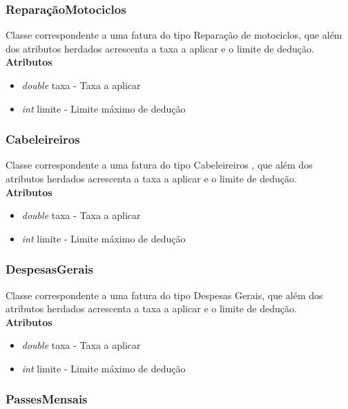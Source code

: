 \documentclass[10pt,a4paper]{article}
\begin{document}
\subsubsection{ReparaçãoMotociclos}

Classe correspondente a uma fatura do tipo Reparação de motociclos, que além dos atributos herdados acrescenta a taxa a aplicar e o limite de dedução.\\

{\bf{Atributos}}
\begin{itemize}
 \item \textit{double} taxa - Taxa a aplicar
 \item \textit{int} limite - Limite máximo de dedução
\end{itemize}

\subsubsection{Cabeleireiros}

Classe correspondente a uma fatura do tipo Cabeleireiros , que além dos atributos herdados acrescenta a taxa a aplicar e o limite de dedução.\\

{\bf{Atributos}}
\begin{itemize}
 \item \textit{double} taxa - Taxa a aplicar
 \item \textit{int} limite - Limite máximo de dedução
\end{itemize}

\subsubsection{DespesasGerais}

Classe correspondente a uma fatura do tipo Despesas Gerais, que além dos atributos herdados acrescenta a taxa a aplicar e o limite de dedução. \\

{\bf{Atributos}}
\begin{itemize}
 \item \textit{double} taxa - Taxa a aplicar
 \item \textit{int} limite - Limite máximo de dedução
\end{itemize}

\subsubsection{PassesMensais}
\end{document}
